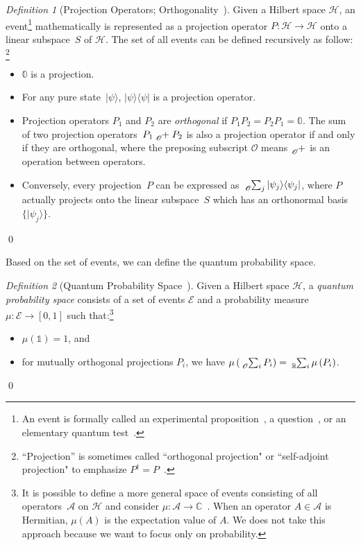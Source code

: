 \documentclass{article}
\theoremstyle{remark}
\newtheorem{definition}{Definition}
\newcommand{\events}{\ensuremath{\mathcal{E}}}
\newcommand{\Hilb}{\mathcal{H}}
\newcommand{\ket}[1]{|#1\rangle}
\newcommand{\proj}[1]{|#1 \rangle\langle #1 |}
\def\C{{\mathbb{C}}}
\begin{document}
\begin{definition}[Projection Operators;
Orthogonality~\cite{10.2307/2308516,Redhead1987-REDINA,peres1995quantum,Griffiths2003,Swart2013}]
\label{def:Projection} Given a Hilbert space $\Hilb$, an event\footnote{An event
is formally called an experimental proposition~\cite{BirkhoffVonNeumann1936}, a question~\cite{10.2307/2308516,DBLP:journals/corr/abs-0910-2393}, or an
elementary quantum test~\cite{peres1995quantum}.} mathematically is represented as a projection operator $P:\Hilb\rightarrow\Hilb$ onto a linear subspace~$S$ of $\Hilb$. The set of all events can be defined recursively as follow:
\footnote {``Projection'' is sometimes called
``orthogonal projection" or ``self-adjoint projection" to
emphasize $P^{\dagger} = P$~\cite{Griffiths2003,Maassen2010}.}
\begin{itemize}
\item $\mathbb{0}$ is a projection. 
\item For any pure state~$\ket{\psi}$, $\proj{\psi}$ is a projection
operator. 
\item Projection operators $P_1$ and $P_2$ are \emph{orthogonal} if $P_1P_2 =
  P_2P_1 = \mathbb{0}$. The sum of two projection operators~$P_{1}\tensor*[_{\mathscr{O}}]{+}{}P_{2}$
is also a projection operator if and only if they are orthogonal, 
where the preposing subscript $\mathscr{O}$
means $\tensor*[_{\mathscr{O}}]{+}{}$ is an operation between operators. 
\item Conversely, every projection~$P$ can be expressed as
$\tensor*[_{\mathscr{O}}]{\sum}{_j}\proj{\psi_{j}}$,
where $P$ actually projects onto the linear subspace~$S$ which
has an orthonormal basis~$\{\ket{\psi_{j}}\}$. 
\end{itemize}
\qed\end{definition}

Based on the set of events, we can define the quantum probability
space.

\begin{definition}[Quantum Probability Space~\cite{10.2307/2308516,gleason1957,Redhead1987-REDINA,Maassen2010}]
  Given a Hilbert space $\Hilb$, a \emph{quantum probability space}
  consists of a set of events $\events$ and a probability measure
  $\mu : \events \rightarrow [0,1]$ such that:\footnote {It is
    possible to define a more general space of events consisting of
    all operators~$\mathcal{A}$ on $\Hilb$ and consider
    $\mu:\mathcal{A}\rightarrow\C$~\cite{Maassen2010,Swart2013}.  When
    an operator $A\in\mathcal{A}$ is Hermitian, $\mu\left(A\right)$ is
    the expectation value of $A$. We does not take this approach
    because we want to focus only on probability. }
\begin{itemize}
\item $\mu(\mathbb{1})=1$, and 
\item for mutually orthogonal projections $P_{i}$, we have 
$\mu\left(\tensor*[_{\mathscr{O}}]{\sum}{_{i}}P_{i}\right)=\tensor*[_{\mathbb{R}}]{\sum}{_{i}}\mu\left(P_{i}\right)$.
\end{itemize}
\qed\end{definition}
\end{document}
